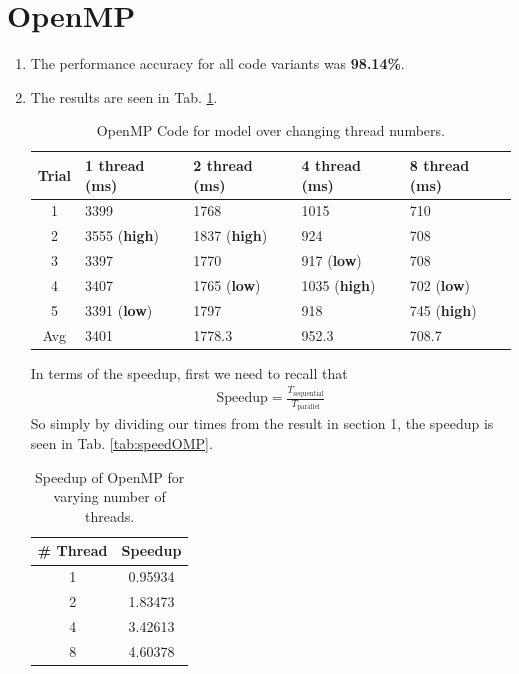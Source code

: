\documentclass[a4paper,12pt]{article}
\theoremstyle{definition}
\theoremstyle{remark}
\begin{document}
		\section{OpenMP}
		\begin{enumerate}
			\item The performance accuracy for all code variants was \textbf{98.14\%}.
			\item The results are seen in Tab. \ref{tab:OpenMP}.
			 \begin{table}[h]
				\centering
				\begin{tabular}{|c|l|l|l|l|}
					\hline
					\textbf{Trial}& \textbf{1 thread (ms)}  &\textbf{2 thread (ms)}  &\textbf{4  thread (ms)}  &\textbf{8 thread (ms)}  \\
					\hline\hline
					1& 3399 & 1768 &1015  &  710\\
					2&  3555 (\textbf{high})&1837 (\textbf{high}) &924  &  708\\
					3& 3397 & 1770 & 917 (\textbf{low}) &708  \\
					4& 3407 & 1765 (\textbf{low}) & 1035 (\textbf{high}) & 702 (\textbf{low})  \\
					5& 3391 (\textbf{low}) &1797  & 918 & 745 (\textbf{high})  \\
					\hline
					Avg& 3401 &1778.3  &952.3  & 708.7 \\
					\hline
				\end{tabular}
				\caption{OpenMP Code for model over changing thread numbers.}
				\label{tab:OpenMP}
			\end{table}
			In terms of the speedup, first we need to recall that 
			\begin{align}
				\text{Speedup} = \frac{T_{\text{sequential}}}{T_{\text{parallel}}}\label{eqn:speedup}
			\end{align}
			So simply by dividing our times from the result in section 1, the speedup is seen in Tab. \ref{tab:speedOMP}.
			\begin{table}[h]
				\centering
				\begin{tabular}{|c|c|}
					\hline
					\textbf{\# Thread}& \textbf{Speedup}  \\
					\hline\hline
					1&  0.95934 \\
					2&   1.83473\\
					4&   3.42613\\
					8&   4.60378\\\hline
				\end{tabular}
				\caption{Speedup of OpenMP for varying number of threads.}

\end{table}
\end{enumerate}
\end{document}
